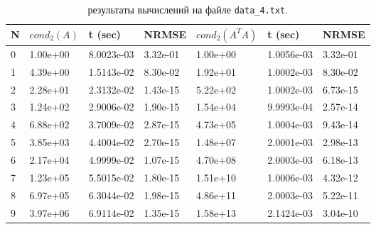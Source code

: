 \documentclass{article}
\begin{document}
\begin{table}[H]
\begin{tabular}{|l||l|l|l||l|l|l|}
\hline
N & $cond_2(A)$ & t (sec)    & NRMSE    & $cond_2(A^TA)$ & t (sec)    & NRMSE    \\ \hline
0 & 1.00e+00   & 8.0023e-03 & 3.32e-01 & 1.00e+00                       & 1.0056e-03 & 3.32e-01 \\ \hline
1 & 4.39e+00   & 1.5143e-02 & 8.30e-02 & 1.92e+01                       & 1.0002e-03 & 8.30e-02 \\ \hline
2 & 2.28e+01   & 2.3132e-02 & 1.43e-15 & 5.22e+02                       & 1.0002e-03 & 6.73e-15 \\ \hline
3 & 1.24e+02   & 2.9006e-02 & 1.90e-15 & 1.54e+04                       & 9.9993e-04 & 2.57e-14 \\ \hline
4 & 6.88e+02   & 3.7009e-02 & 2.87e-15 & 4.73e+05                       & 1.0004e-03 & 9.43e-14 \\ \hline
5 & 3.85e+03   & 4.4004e-02 & 2.70e-15 & 1.48e+07                       & 2.0001e-03 & 2.98e-13 \\ \hline
6 & 2.17e+04   & 4.9999e-02 & 1.07e-15 & 4.70e+08                       & 2.0003e-03 & 6.18e-13 \\ \hline
7 & 1.23e+05   & 5.5015e-02 & 1.80e-15 & 1.51e+10                       & 1.0006e-03 & 4.32e-12 \\ \hline
8 & 6.97e+05   & 6.3044e-02 & 1.98e-15 & 4.86e+11                       & 2.0003e-03 & 5.22e-11 \\ \hline
9 & 3.97e+06   & 6.9114e-02 & 1.35e-15 & 1.58e+13                       & 2.1424e-03 & 3.04e-10 \\ \hline
\end{tabular}
\caption{результаты вычислений на файле \texttt{data\_4.txt}.}
\end{table}
\end{document}
